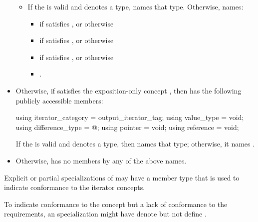 \begin{itemize}
\begin{itemize}
\item If the   is valid and
denotes a type,  names that type.
Otherwise,  names:
\begin{itemize}
\item
{}
if
 satisfies ,
or otherwise
\item
{} if
 satisfies ,
or otherwise
\item
{} if
 satisfies ,
or otherwise
\item
{}.
\end{itemize}
\end{itemize}

\item
Otherwise, if  satisfies the exposition-only concept
, then 
has the following publicly accessible
members:
\begin{codeblock}
using iterator_category = output_iterator_tag;
using value_type        = void;
using difference_type   = @\seebelow@;
using pointer           = void;
using reference         = void;
\end{codeblock}
If the 
 is valid and denotes a type,
then  names that type; otherwise, it names .

\item
Otherwise, 
has no members by any of the above names.
\end{itemize}

\pnum
Explicit or partial specializations of  may
have a member type  that is used to indicate
conformance to the iterator concepts.
\begin{example}
To indicate conformance to the  concept
but a lack of conformance to
the  requirements,
an  specialization might have
 denote 
but not define .
\end{example}

